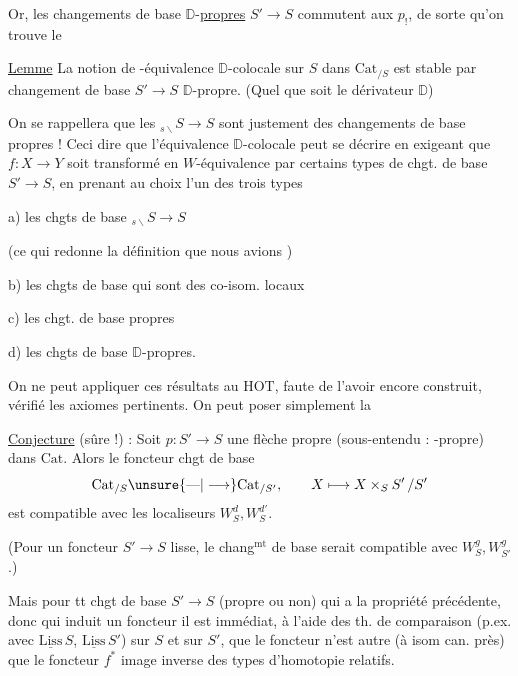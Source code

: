 Or, les changements de base $\mathbb D$-\uline{propres} $S'\longrightarrow S$ commutent aux $p_!$, de sorte qu'on trouve le

\uline{Lemme} La notion de -équivalence $\mathbb D$-colocale sur $S$ dans $\mathrm{Cat}_{/S}$ est stable par  changement de base $S'\longrightarrow S$ $\mathbb D$-propre. (Quel que soit le dérivateur $\mathbb D$)

 On se rappellera que les $ {}_{s\backslash}S\longrightarrow S$ sont justement des changements de base propres ! Ceci  dire que l'équivalence $\mathbb D$-colocale peut se décrire en exigeant que $f:X\longrightarrow Y$ soit transformé en $W$-équivalence par certains types de chgt. de base $S'\longrightarrow S$, en prenant au choix l'un des trois types

a) les chgts de base $ {}_{s\backslash}S\longrightarrow S$

(ce qui redonne la définition que nous avions )

b) les chgts de base qui sont des co-isom. locaux

c) les chgt. de base propres

d) les chgts de base $\mathbb D$-propres.

On ne peut appliquer ces résultats au 
$\mathrm{HOT}$, faute de l'avoir encore construit,  vérifié les axiomes pertinents. On peut poser simplement la

\uline{Conjecture} (sûre !) : Soit $p:S'\longrightarrow S$ une flèche propre (sous-entendu : -propre) dans $\mathrm{Cat}$. Alors le foncteur chgt de base
\[
\mathrm{Cat}_{/S}\unsure{\text{---}|\longrightarrow}\mathrm{Cat}_{/S'},\qquad X\longmapsto X\times_S S'\,/S'
\]
est compatible avec les localiseurs $W_S^d,W_S^{d'}$.

(Pour un foncteur $S'\longrightarrow S$ lisse, le chang$^{\mathrm{mt}}$ de base serait compatible avec $W_S^g,W_{S'}^g$.)

Mais pour tt chgt de base $S'\longrightarrow S$ (propre ou non) qui a la propriété précédente, donc qui induit un foncteur
il est immédiat, à l'aide des th. de comparaison (p.ex. avec $\underline{\mathrm{Liss}}\,S$, $\underline{\mathrm{Liss}}\,S'$) sur $S$ et sur $S'$, que le foncteur n'est autre (à isom can. près) que le foncteur $f^*$ image inverse des types d'homotopie relatifs. 

